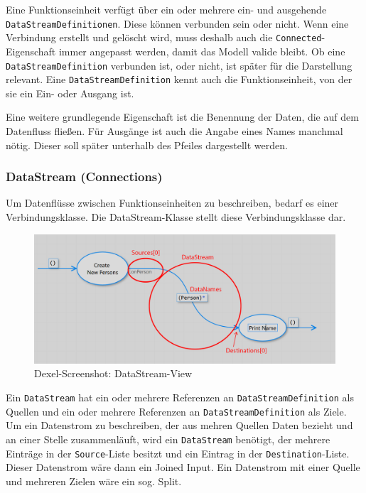 	Eine Funktionseinheit verfügt über ein oder mehrere ein- und ausgehende
	\\\texttt{DataStreamDefinitionen}. Diese können verbunden sein oder nicht. Wenn eine
	Verbindung erstellt und gelöscht wird, muss deshalb auch die \texttt{Connected}-Eigenschaft
	immer angepasst werden, damit das Modell valide bleibt.
	Ob eine \texttt{DataStreamDefinition} verbunden ist, oder nicht, ist später
	für die Darstellung relevant.
	Eine \texttt{DataStreamDefinition} kennt auch die Funktionseinheit, von der sie ein
	Ein- oder Ausgang ist.
	
	Eine weitere grundlegende Eigenschaft ist die Benennung der Daten, die auf dem
	Datenfluss fließen. Für Ausgänge ist auch die Angabe eines
	Names manchmal nötig. Dieser soll später unterhalb des Pfeiles
	dargestellt werden.

\subsubsection{DataStream (Connections)}

Um Datenflüsse zwischen Funktionseinheiten zu beschreiben, bedarf es einer
Verbindungsklasse. Die DataStream-Klasse stellt diese Verbindungsklasse dar.



		\begin{figure}[H]
			\centering
			\includegraphics[width=0.9\linewidth]{./img/DataStreamView.png} 
			\caption{Dexel-Screenshot: DataStream-View}
		\end{figure}


Ein \texttt{DataStream} hat ein oder mehrere Referenzen an \texttt{DataStreamDefinition} als
Quellen und ein oder mehrere Referenzen an \texttt{DataStreamDefinition} als Ziele.
Um ein Datenstrom zu beschreiben, der aus mehren Quellen Daten bezieht und
an einer Stelle zusammenläuft, wird ein \texttt{DataStream} benötigt, der mehrere
Einträge in der \texttt{Source}-Liste besitzt und ein Eintrag in der
\texttt{Destination}-Liste. Dieser Datenstrom wäre dann ein Joined Input.
Ein Datenstrom mit einer Quelle und mehreren Zielen wäre ein sog. Split.

